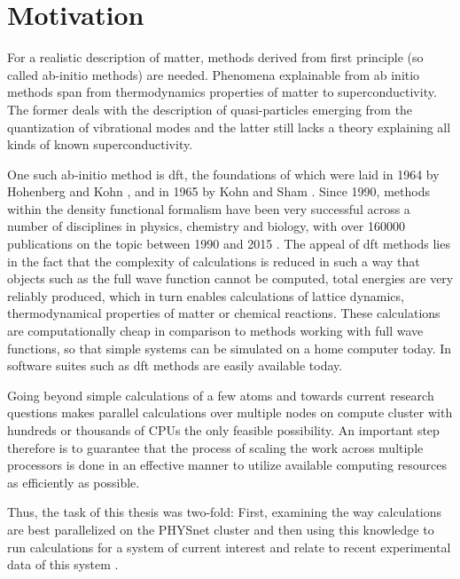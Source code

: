 \documentclass[main.tex]{subfiles}
\begin{document}
\chapter{Motivation}

For a realistic description of matter, methods derived from first principle (so called ab-initio methods) are needed.
Phenomena explainable from ab initio methods span from thermodynamics properties of matter to superconductivity.
The former deals with the description of quasi-particles emerging from the quantization of vibrational modes and the latter still lacks a theory explaining all kinds of known superconductivity.

One such ab-initio method is \gls{dft}, the foundations of which were laid in 1964 by Hohenberg and Kohn \cite{hohenberg_inhomogeneous_1964}, and in 1965 by Kohn and Sham \cite{kohn_self-consistent_1965}.
Since 1990, methods within the density functional formalism have been very successful across a number of disciplines in physics, chemistry and biology, with over \num{160000} publications on the topic between 1990 and 2015 \cite{jones_density_2015}.
The appeal of \gls{dft} methods lies in the fact that the complexity of calculations is reduced in such a way that objects such as the full wave function cannot be computed, total energies are very reliably produced, which in turn enables calculations of lattice dynamics, thermodynamical properties of matter or chemical reactions.
These calculations are computationally cheap in comparison to methods working with full wave functions, so that simple systems can be simulated on a home computer today.
In software suites such as \QE \cite{giannozzi_quantum_2009,giannozzi_advanced_2017} \gls{dft} methods are easily available today.

Going beyond simple calculations of a few atoms and towards current research questions makes parallel calculations over multiple nodes on compute cluster with hundreds or thousands of CPUs the only feasible possibility.
An important step therefore is to guarantee that the process of scaling the work across multiple processors is done in an effective manner to utilize available computing resources as efficiently as possible.

Thus, the task of this thesis was two-fold:
First, examining the way \QE calculations are best parallelized on the PHYSnet cluster and then using this knowledge to run calculations for a system of current interest and relate to recent experimental data of this system \cite{hall_environmental_2019}.
\end{document}
